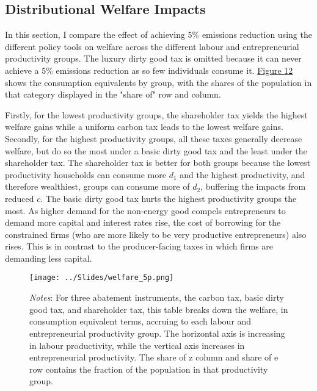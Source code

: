 \documentclass[12pt,a4paper]{article}
\begin{document}
\subsection{Distributional Welfare Impacts}


\hspace*{6mm}  In this section, I compare the effect of achieving 5\% emissions reduction using the different policy tools on welfare across the different labour and entrepreneurial productivity groups. The luxury dirty good tax is omitted because it can never achieve a 5\% emissions reduction as so few individuals consume it. \hyperref[fig:welfaredistribution]{Figure 12} shows the consumption equivalents by group, with the shares of the population in that category displayed in the "share of" row and column.

\hspace*{6mm}  Firstly, for the lowest productivity groups, the shareholder tax yields the highest welfare gains while a uniform carbon tax leads to the lowest welfare gains. Secondly, for the highest productivity groups, all these taxes generally decrease welfare, but do so the most under a basic dirty good tax and the least under the shareholder tax. The shareholder tax is better for both groups because the lowest productivity households can consume more $d_1$ and the highest productivity, and therefore wealthiest, groups can consume more of $d_2$, buffering the impacts from reduced $c$. The basic dirty good tax hurts the highest productivity groups the most. As higher demand for the non-energy good compels entrepreneurs to demand more capital and interest rates rise, the cost of borrowing for the constrained firms (who are more likely to be very productive entrepreneurs) also rises. This is in contrast to the producer-facing taxes in which firms are demanding less capital. 


\begin{figure}[h! tbp]
\begin{center}
\centering
\texttt{[image: ../Slides/welfare\_5p.png]}
\captionsetup{font=footnotesize}
\caption*{\textit{Notes}: For three abatement instruments, the carbon tax, basic dirty good tax, and shareholder tax, this table breaks down the welfare, in consumption equivalent terms, accruing to each labour and entrepreneurial productivity group. The horizontal axis is increasing in labour productivity, while the vertical axis increases in entrepreneurial productivity. The share of z column and share of e row contains the fraction of the population in that productivity group.}
  \label{fig:welfaredistribution}
\end{center}
\end{figure}
\end{document}
